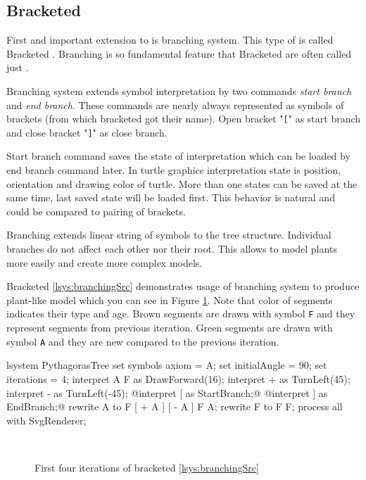 \subsection{Bracketed \lsystems}

First and important extension to \dzerolsystem is branching system.
This type of \lsystem is called Bracketed \lsystem\cite{PL91}.
Branching is so fundamental feature that Bracketed \lsystems are often called just \lsystems.

Branching system extends symbol interpretation by two commands \emph{start branch} and \emph{end branch}.
These commands are nearly always represented as symbols of brackets (from which bracketed \lsystems got their name).
Open bracket "\texttt{[}" as start branch and close bracket "\texttt{]}" as close branch.

Start branch command saves the state of interpretation which can be loaded by end branch command later.
In turtle graphics interpretation state is position, orientation and drawing color of turtle.
More than one states can be saved at the same time, last saved state will be loaded first.
This behavior is natural and could be compared to pairing of brackets.

Branching extends linear string of symbols to the tree structure.
Individual branches do not affect each other nor their root.
This allows to model plants more easily and create more complex models.

Bracketed \lsystem \ref{lsys:branchingSrc} demonstrates usage of branching system to produce plant-like model which you can see in Figure \ref{fig:branching}.
Note that color of segments indicates their type and age.
Brown segments are drawn with symbol \texttt{F} and they represent segments from previous iteration.
Green segments are drawn with symbol \texttt{A} and they are new compared to the previous iteration.

\begin{Lsystem}[label=lsys:branchingSrc,caption={Bracketed \lsystem which creates plant-like model (Fig. \ref{fig:branching})}]
lsystem PythagorasTree {
	set symbols axiom = A;
	set initialAngle = 90;
	set iterations = 4;	
	interpret A F as DrawForward(16);
	interpret + as TurnLeft(45);
	interpret - as TurnLeft(-45);
	@interpret [ as StartBranch;@
	@interpret ] as EndBranch;@
	rewrite A to F [ + A ] [ - A ] F A;
	rewrite F to F F;
}
process all with SvgRenderer;
\end{Lsystem}

\begin{figure}[h]
	\centering
	 ~
	 ~
	 ~
	\caption{First four iterations of bracketed \lsystem \ref{lsys:branchingSrc}}
	\label{fig:branching}
\end{figure}



